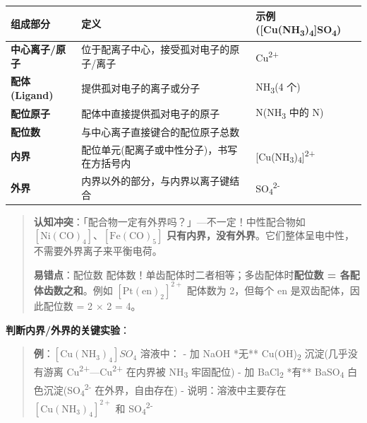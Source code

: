 {\def\LTcaptype{none} %
\begin{longtable}[]{@{}
  >{\raggedright\arraybackslash}p{}
  >{\raggedright\arraybackslash}p{}
  >{\raggedright\arraybackslash}p{}@{}}
\toprule\noalign{}
\begin{minipage}[b]{\linewidth}\raggedright
组成部分
\end{minipage} & \begin{minipage}[b]{\linewidth}\raggedright
定义
\end{minipage} & \begin{minipage}[b]{\linewidth}\raggedright
示例({[}Cu(NH\textsubscript{3})\textsubscript{4}{]}SO\textsubscript{4})
\end{minipage} \\
\midrule\noalign{}
\endhead
\bottomrule\noalign{}
\endlastfoot
\textbf{中心离子/原子} & 位于配离子中心，接受孤对电子的原子/离子 & Cu\textsuperscript{2+} \\
\textbf{配体 (Ligand)} & 提供孤对电子的离子或分子 & NH\textsubscript{3}(4 个) \\
\textbf{配位原子} & 配体中直接提供孤对电子的原子 & N(NH\textsubscript{3} 中的 N) \\
\textbf{配位数} & 与中心离子直接键合的配位原子总数 & 4 \\
\textbf{内界} & 配位单元(配离子或中性分子)，书写在方括号内 & {[}Cu(NH\textsubscript{3})\textsubscript{4}{]}\textsuperscript{2+} \\
\textbf{外界} & 内界以外的部分，与内界以离子键结合 & SO\textsubscript{4}\textsuperscript{2-} \\
\end{longtable}
}

\begin{quote}
\textbf{认知冲突}：「配合物一定有外界吗？」---不一定！中性配合物如 \([\mathrm{Ni(CO)_4}]\)、\([\mathrm{Fe(CO)_5}]\) \textbf{只有内界，没有外界}。它们整体呈电中性，不需要外界离子来平衡电荷。

\textbf{易错点}：配位数  配体数！单齿配体时二者相等；多齿配体时\textbf{配位数 = 各配体齿数之和}。例如 \([\mathrm{Pt(en)_2}]^{2+}\) 配体数为 2，但每个 en 是双齿配体，因此配位数 = 2 × 2 = 4。
\end{quote}

\textbf{判断内界/外界的关键实验}：

\begin{quote}
\textbf{例}：\([\mathrm{Cu(NH_3)_4}]SO_4\) 溶液中：
- 加 NaOH \箭 **无** Cu(OH)\textsubscript{2} 沉淀(几乎没有游离 Cu\textsuperscript{2+}---Cu\textsuperscript{2+} 在内界被 NH\textsubscript{3} 牢固配位)
- 加 BaCl\textsubscript{2} \箭 **有** BaSO\textsubscript{4} 白色沉淀(SO\textsubscript{4}\textsuperscript{2-} 在外界，自由存在)
- 说明：溶液中主要存在 \([\mathrm{Cu(NH_3)_4}]^{2+}\) 和 SO\textsubscript{4}\textsuperscript{2-}
\end{quote}

